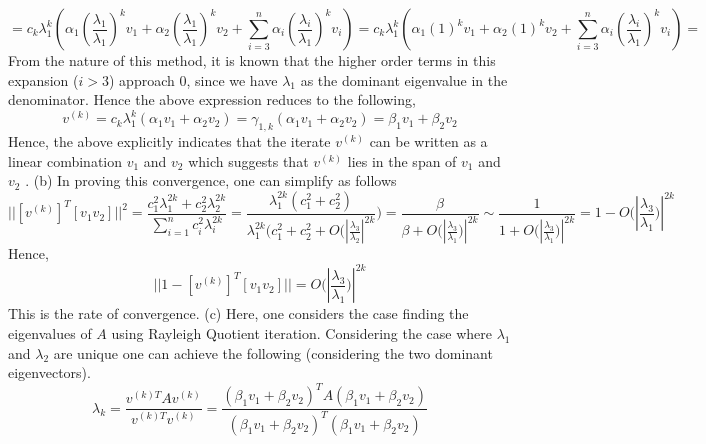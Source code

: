\documentclass{article}
\begin{document}
$$ =  c_{k}\lambda_{1}^{k}(\alpha_{1}(\frac{\lambda_{1}}{\lambda_{1}})^{k} v_{1} +   \alpha_{2}(\frac{\lambda_{1}}{\lambda_{1}})^{k} v_{2} +  \sum_{i=3}^{n}\alpha_{i}(\frac{\lambda_{i}}{\lambda_{1}})^{k} v_{i} )=  c_{k}\lambda_{1}^{k}(\alpha_{1}(1)^{k} v_{1} +   \alpha_{2}(1)^{k} v_{2} +  \sum_{i=3}^{n}\alpha_{i}(\frac{\lambda_{i}}{\lambda_{1}})^{k} v_{i} )= 
$$  
From the nature of this method, it is known that the higher order terms in this expansion ($i>3$) approach 0, since we have $\lambda_{1}$ as the dominant eigenvalue in the denominator. Hence the above expression reduces to the following, 
$$v^{(k)}= c_{k}\lambda_{1}^{k}(\alpha_{1} v_{1} +   \alpha_{2} v_{2} ) =\gamma_{1,k}(\alpha_{1} v_{1} +   \alpha_{2} v_{2} )   = \beta_{1} v_{1} +   \beta_{2} v_{2} $$
Hence, the above explicitly indicates that the iterate $ v^{(k)}$ can be written as a linear combination  $ v_{1} $ and $ v_{2}$ which suggests that $ v^{(k)}$ lies in the span of   $ v_{1} $ and $ v_{2}$ . 
\newline 
\newline 
(b) \newline 
\newline 
In proving this convergence, one can simplify as follows 
$$ ||[v^{(k)}]^{T} [v_{1} v_{2}]||^{2}  = \frac{c_{1}^{2}  \lambda_{1}^{2k}  +  c_{2}^{2}  \lambda_{2}^{2k} }{\sum_{i=1}^{n}   c_{i}^{2}  \lambda_{i}^{2k}} =
 \frac{   \lambda_{1}^{2k} (c_{1}^{2} +  c_{2}^{2} ) }{ \lambda_{1}^{2k}(  c_{1}^{2} +  c_{2}^{2}   + O (| \frac{\lambda_{3}}{  \lambda_{2}}|^{2k}}) =  
 \frac{\beta }{ \beta  + O (| \frac{\lambda_{3}}{\lambda_{1}})|^{2k}}  \sim  \frac{1 }{ 1  + O (| \frac{\lambda_{3}}{\lambda_{1}})|^{2k}}= 
 1-   O (| \frac{\lambda_{3}}{\lambda_{1}})|^{2k}  
 $$ 
Hence, 
$$ ||1-[v^{(k)}]^{T} [v_{1} v_{2}]||  = O (| \frac{\lambda_{3}}{\lambda_{1}})|^{2k}  $$  This is the rate of convergence. 
(c) Here, one considers the case finding the eigenvalues of $A$ using Rayleigh Quotient iteration. Considering the case where $\lambda_{1}$ and  $\lambda_{2}$ are unique one can achieve the following (considering the two dominant eigenvectors). 
\newline  
$$\lambda_{k} = \frac{v^{(k)T}A v^{(k)}}{v^{(k)T} v^{(k)}} = \frac{(\beta_{1} v_{1} +   \beta_{2} v_{2})^{T}A (\beta_{1} v_{1} +   \beta_{2} v_{2})}{(\beta_{1} v_{1} +   \beta_{2} v_{2})^{T} (\beta_{1} v_{1} +   \beta_{2} v_{2})}$$ 
\end{document}
